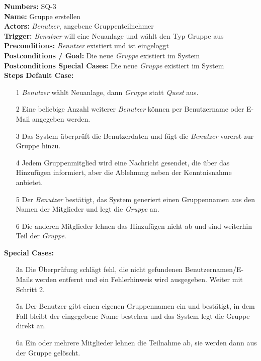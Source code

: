 \documentclass{article}
\begin{document}
\begin{samepage}
	\textbf{Numbers:} SQ-3 \\
	\textbf{Name:} Gruppe erstellen \\
	\textbf{Actors:} \textit{Benutzer}, angebene Gruppenteilnehmer \\
	\textbf{Trigger:} \textit{Benutzer} will eine Neuanlage und wählt den Typ Gruppe aus \\ 
	\textbf{Preconditions:} \textit{Benutzer} existiert und ist eingeloggt \\ 
	\textbf{Postconditions / Goal:} Die neue \textit{Gruppe} existiert im System \\
	\textbf{Postconditions Special Cases:} Die neue \textit{Gruppe} existiert im System \\
	\textbf{Steps Default Case:}
	\begin{itemize}
		\item[1] \textit{Benutzer} wählt Neuanlage, dann \textit{Gruppe} statt \textit{Quest} aus.
		\item[2] Eine beliebige Anzahl weiterer \textit{Benutzer} können per Benutzername oder E-Mail angegeben werden.
		\item[3] Das System überprüft die Benutzerdaten und fügt die \textit{Benutzer} vorerst zur Gruppe hinzu.
  		\item[4] Jedem Gruppenmitglied wird eine Nachricht gesendet, die über das Hinzufügen informiert, aber die Ablehnung neben der Kenntnisnahme anbietet.
    		\item[5] Der \textit{Benutzer} bestätigt, das System generiert einen Gruppennamen aus den Namen der Mitglieder und legt die \textit{Gruppe} an.
      		\item[6] Die anderen Mitglieder lehnen das Hinzufügen nicht ab und sind weiterhin Teil der \textit{Gruppe}.
	\end{itemize}
	\textbf{Special Cases:}
	\begin{itemize}
	\item [3a] Die Überprüfung schlägt fehl, die nicht gefundenen Benutzernamen/E-Mails werden entfernt und ein Fehlerhinweis wird ausgegeben. Weiter mit Schritt 2.
 	\item [5a] Der Benutzer gibt einen eigenen Gruppennamen ein und bestätigt, in dem Fall bleibt der eingegebene Name bestehen und das System legt die Gruppe direkt an.
  	\item [6a] Ein oder mehrere Mitglieder lehnen die Teilnahme ab, sie werden dann aus der Gruppe gelöscht.
	\end{itemize}
	\end{samepage}
\end{document}

